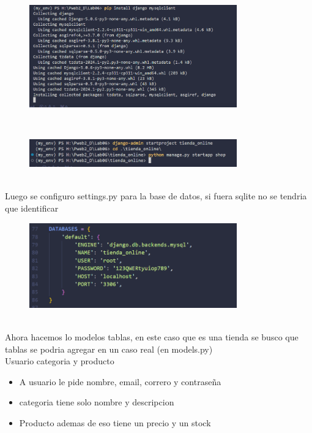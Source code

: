 \documentclass{article}
\begin{document}
    \begin{figure}[H]
		          \centering
		          \includegraphics[width=0.8\textwidth,keepaspectratio]                       {img/djangoIns.png}
    \end{figure}
\\
    \begin{figure}[H]
		          \centering
		          \includegraphics[width=0.8\textwidth,keepaspectratio]                       {img/iniApp.png}
    \end{figure}

\\    
    
Luego se configuro settings.py para la base de datos, si fuera sqlite no se tendria que identificar
    \begin{figure}[H]
		          \centering
		          \includegraphics[width=0.8\textwidth,keepaspectratio]                       {img/settings.png}
    \end{figure}
\\
Ahora hacemos lo modelos tablas, en este caso que es una tienda se busco que tablas se podria agregar en un caso real (en models.py)
\\Usuario categoria y producto
\begin{itemize}
    \item A usuario le pide nombre, email, correro y contraseña
    \item categoria tiene solo nombre y descripcion
    \item Producto ademas de eso tiene un precio y un stock
\end{itemize}
\end{document}
